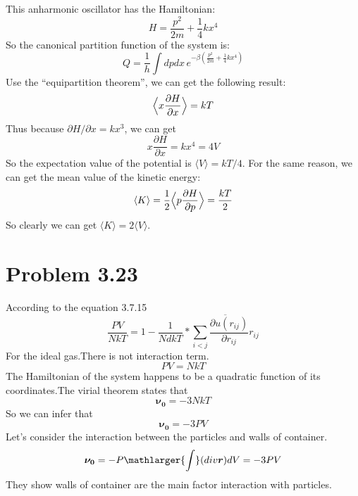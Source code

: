 \documentclass{article}
\begin{document}
	This anharmonic oscillator has the Hamiltonian:
	$$
	H = \frac{p^2}{2m} + \frac{1}{4}kx^4
	$$
	So the canonical partition function of the system is:
	\begin{equation}
	Q = \frac{1}{h}\int dpdx\,e^{-\beta\left(\frac{p^2}{2m} + \frac{1}{4}kx^4\right) }
	\end{equation}
	Use the ``equipartition theorem'', we can get the following result:
	\begin{equation}
	\Big{\langle} x \frac{\partial H}{\partial x}\Big{\rangle} =kT
	\end{equation}
	Thus because $\partial H/\partial x = kx^3$, we can get
	$$
	x\frac{\partial H}{\partial x} = kx^4 = 4V
	$$
	So the expectation value of the potential is $\langle V\rangle = kT/4$. For the same reason, we can get the mean value of the kinetic energy:
	\begin{equation}
	\langle K\rangle = \frac{1}{2}\Big{\langle} p\frac{\partial H}{\partial p}\Big{\rangle} = \frac{kT}{2}
	\end{equation}
	So clearly we can get $\langle K\rangle = 2\langle V\rangle$.
	

\section*{Problem 3.23} %
\label{sec:problem_3_23}
	According to the equation 3.7.15
	$$\frac{PV}{NkT}=1-\frac{1}{NdkT}*\overline{\sum_{i<j}\frac{\partial{u(r_{ij})}}{\partial{r_{ij}}}r_{ij}}$$
	For the ideal gas.There is not interaction term.
	$$PV=NkT$$
	The Hamiltonian of the system happens to be a quadratic function of its coordinates.The virial theorem states that
	$$\boldsymbol{\nu_0}=-3NkT$$
	So we can infer that
	$$\boldsymbol{\nu_0}=-3PV$$
	Let's consider the interaction between the particles and walls of container. 
	$$\boldsymbol{\nu_0}=-P\mathlarger{\int}(div\boldsymbol{ r})dV=-3PV$$
	They show walls of container are the main factor interaction with particles.
\end{document}
